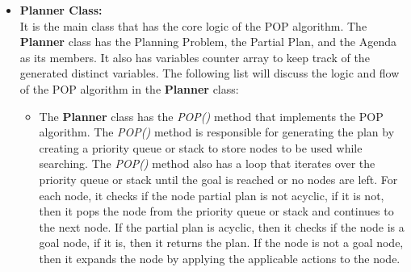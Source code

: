 \begin{itemize}
    \item \textbf{Planner Class:} \\
          It is the main class that has the core logic of the \ac{POP} algorithm. The \textbf{Planner} class has the Planning Problem, the Partial Plan, and the Agenda as its members. It also has variables counter array to keep track of the generated distinct variables. The following list will discuss the logic and flow of the \ac{POP} algorithm in the \textbf{Planner} class:
          \begin{itemize}
              \item The \textbf{Planner} class has the \textit{POP()} method that implements the \ac{POP} algorithm. The \textit{POP()} method is responsible for generating the plan by creating a priority queue or stack to store nodes to be used while searching. The \textit{POP()} method also has a loop that iterates over the priority queue or stack until the goal is reached or no nodes are left.
                    For each node, it checks if the node partial plan is not acyclic, if it is not, then it pops the node from the priority queue or stack and continues to the next node. If the partial plan is acyclic, then it checks if the node is a goal node, if it is, then it returns the plan. If the node is not a goal node, then it expands the node by applying the applicable actions to the node.


\end{itemize}
\end{itemize}
